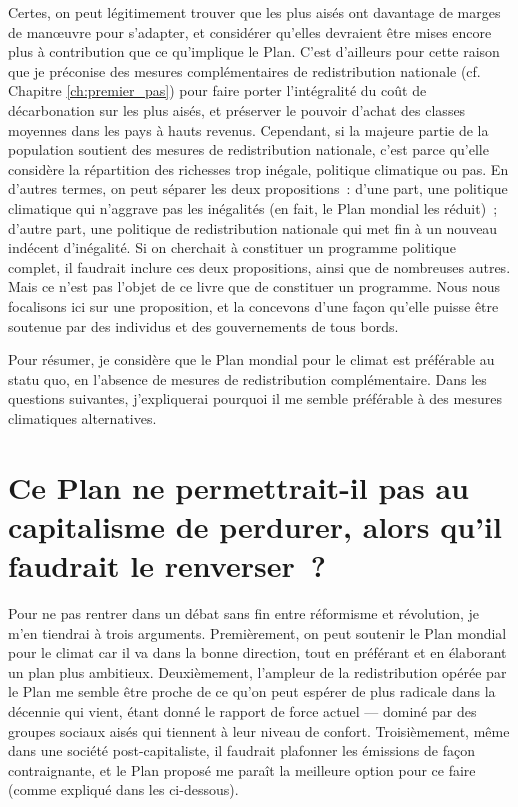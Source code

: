 \documentclass[a5paper,french]{memoir}
\begin{document}
Certes, on peut légitimement trouver que les plus aisés ont davantage de marges de manœuvre pour s'adapter, et considérer qu'elles devraient être mises encore plus à contribution que ce qu'implique le Plan. C'est d'ailleurs pour cette raison que je préconise des mesures complémentaires de redistribution nationale (cf. Chapitre \ref{ch:premier_pas}) pour faire porter l'intégralité du coût de décarbonation sur les plus aisés, et préserver le pouvoir d'achat des classes moyennes dans les pays à hauts revenus. Cependant, si la majeure partie de la population soutient des mesures de redistribution nationale, c'est parce qu'elle considère la répartition des richesses trop inégale, politique climatique ou pas. En d'autres termes, on peut séparer les deux propositions~: d'une part, une politique climatique qui n'aggrave pas les inégalités (en fait, le Plan mondial les réduit)~; d'autre part, une politique de redistribution nationale qui met fin à un nouveau indécent d'inégalité. Si on cherchait à constituer un programme politique complet, il faudrait inclure ces deux propositions, ainsi que de nombreuses autres. Mais ce n'est pas l'objet de ce livre que de constituer un programme. Nous nous focalisons ici sur une proposition, et la concevons d'une façon qu'elle puisse être soutenue par des individus et des gouvernements de tous bords. 

Pour résumer, je considère que le Plan mondial pour le climat est préférable au statu quo, en l'absence de mesures de redistribution complémentaire. Dans les questions suivantes, j'expliquerai pourquoi il me semble préférable à des mesures climatiques alternatives. 


\section*{\normalsize Ce Plan ne permettrait-il pas au capitalisme de perdurer, alors qu'il faudrait le renverser~?}\label{q:capitalisme}

Pour ne pas rentrer dans un débat sans fin entre réformisme et révolution, je m'en tiendrai à trois arguments. Premièrement, on peut soutenir le Plan mondial pour le climat car il va dans la bonne direction, tout en préférant et en élaborant un plan plus ambitieux. Deuxièmement, l'ampleur de la redistribution opérée par le Plan me semble être proche de ce qu'on peut espérer de plus radicale dans la décennie qui vient, étant donné le rapport de force actuel --- dominé par des groupes sociaux aisés qui tiennent à leur niveau de confort. %
Troisièmement, même dans une société post-capitaliste, il faudrait plafonner les émissions de façon contraignante, et le Plan proposé me paraît la meilleure option pour ce faire (comme expliqué dans les ci-dessous).
\end{document}

